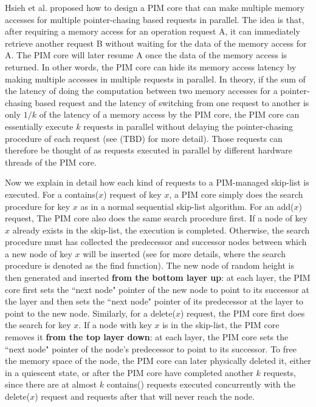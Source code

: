 \documentclass[11pt]{article}
\begin{document}
Hsieh et al. \cite{hsieh2016accelerating} proposed how to design a PIM core that 
can make multiple memory accesses for multiple pointer-chasing based requests in parallel. 
The idea is that, after requiring a memory access for an operation request A, 
it can immediately retrieve another request B without waiting for the data of the memory access for A. 
The PIM core will later resume A once the data of the memory access is returned.  
In other words, the PIM core can hide its memory access latency by making multiple accesses in 
multiple requests in parallel. 
In theory, if the sum of the latency of doing the computation between two memory accesses 
for a pointer-chasing based request and the latency of switching from one request to another 
is only $1/k$ of the latency of a memory access by the PIM core, 
the PIM core can essentially execute $k$ requests in parallel without 
delaying the pointer-chasing procedure of each request (see \cite{} (TBD) for more detail). 
Those requests can therefore be thought of as requests executed in parallel
by different hardware threads of the PIM core. 

Now we explain in detail how each kind of requests to a PIM-managed skip-list is executed. 
For a contains($x$) request of key $x$, a PIM core simply does the search procedure for key $x$
as in a normal sequential skip-list algorithm. 
For an add($x$) request, The PIM core also does the same search procedure first. 
If a node of key $x$ already exists in the skip-list, the execution is completed.
Otherwise, the search procedure must has collected the predecessor and successor nodes 
between which a new node of key $x$ will be inserted 
(see \cite{Herlihy08} for more details, where the search procedure is denoted as the find function). 
The new node of random height is then generated and inserted \textbf{from the bottom layer up}: at each layer, 
the PIM core first sets the ``next node" pointer of the new node to point to its successor at the layer 
and then sets the ``next node" pointer of its predecessor at the layer to point to the new node. 
Similarly, for a delete($x$) request, the PIM core first does the search for key $x$. 
If a node with key $x$ is in the skip-list, the PIM core removes it \textbf{from the top layer down}: 
at each layer, the PIM core sets the ``next node" pointer of the node's predecessor to point to its successor.
To free the memory space of the node, the PIM core can later physically deleted it, either in a quiescent 
state, or after the PIM core have completed another $k$ requests, since there are at almost $k$ contains() 
requests executed concurrently with the delete($x$) request and requests after that will never reach the node. 
\end{document}
